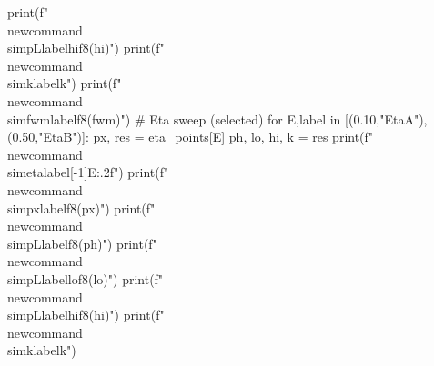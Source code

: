 {{{{        print(f"\\newcommand{{\\simpL{label}hi}}{{{f8(hi)}}}")
        print(f"\\newcommand{{\\simk{label}}}{{{k}}}")
        print(f"\\newcommand{{\\simfwm{label}}}{{{f8(fwm)}}}")
    # Eta sweep (selected)
    for E,label in [(0.10,"EtaA"),(0.50,"EtaB")]:
        px, res = eta_points[E]
        ph, lo, hi, k = res
        print(f"\\newcommand{{\\simeta{label[-1]}}}{{{E:.2f}}}")
        print(f"\\newcommand{{\\simpx{label}}}{{{f8(px)}}}")
        print(f"\\newcommand{{\\simpL{label}}}{{{f8(ph)}}}")
        print(f"\\newcommand{{\\simpL{label}lo}}{{{f8(lo)}}}")
        print(f"\\newcommand{{\\simpL{label}hi}}{{{f8(hi)}}}")
        print(f"\\newcommand{{\\simk{label}}}{{{k}}}")

}}}}
